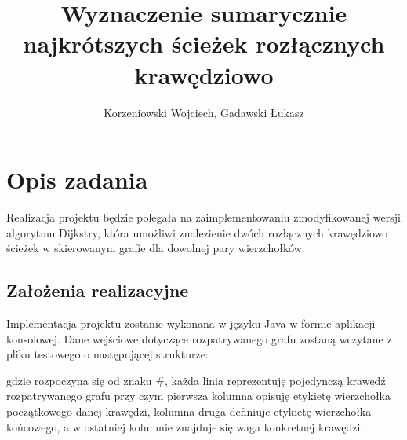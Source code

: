 \documentclass[10pt,a4paper]{article}
\author{Korzeniowski Wojciech, Gadawski Łukasz}
\title{Wyznaczenie sumarycznie najkrótszych ścieżek rozłącznych krawędziowo}
\begin{document}
\maketitle

\section{Opis zadania}
Realizacja projektu będzie polegała na zaimplementowaniu zmodyfikowanej wersji algorytmu Dijkstry, która umożliwi znalezienie dwóch rozłącznych krawędziowo ścieżek w skierowanym grafie dla dowolnej pary wierzchołków.

\subsection{Założenia realizacyjne}
Implementacja projektu zostanie wykonana w języku Java w formie aplikacji konsolowej. Dane wejściowe dotyczące rozpatrywanego grafu zostaną wczytane z pliku testowego o następującej strukturze:



gdzie rozpoczyna się od znaku \#, każda linia reprezentuję pojedynczą krawędź rozpatrywanego grafu przy czym pierwsza kolumna opisuję etykietę wierzchołka początkowego danej krawędzi, kolumna druga definiuje etykietę wierzchołka końcowego, a w ostatniej kolumnie znajduje się waga konkretnej krawędzi.
\end{document}
